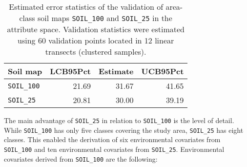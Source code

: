 \begin{table}[ht]
\caption{Estimated error statistics of the validation of area-class soil maps \texttt{SOIL\_100} and \texttt{SOIL\_25} in the attribute space. Validation statistics were estimated using 60 validation points located in 12 linear transects (clustered samples).}
\label{tab:soil-attr-val}
\centering
{\small
\begin{tabular}{lrrr}
\hline
Soil map              & LCB95Pct & Estimate & UCB95Pct \\
\hline
\texttt{SOIL\_100}    & 21.69    & 31.67    & 41.65    \\
\texttt{SOIL\_25}     & 20.81    & 30.00    & 39.19    \\
\hline
\end{tabular}}
\end{table}


The main advantage of \texttt{SOIL\_25} in relation to \texttt{SOIL\_100} is the level of detail. While \texttt{SOIL\_100} has only five classes covering the study area, \texttt{SOIL\_25} has eight classes. This enabled the derivation of six environmental covariates from \texttt{SOIL\_100} and ten environmental covariates from \texttt{SOIL\_25}. Environmental covariates derived from \texttt{SOIL\_100} are the following:

